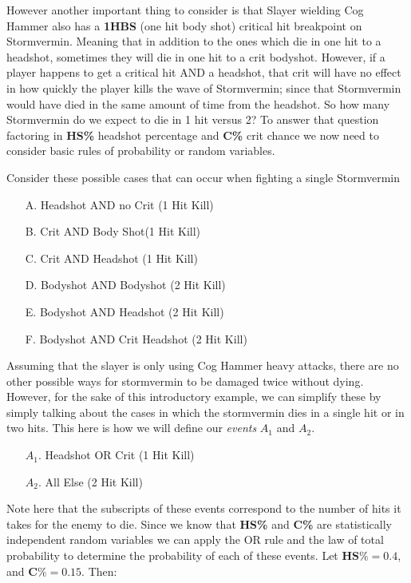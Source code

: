 \documentclass{article}
\begin{document}
However another important thing to consider is that Slayer wielding Cog Hammer also has a \textbf{1HBS} (one hit body shot) critical hit breakpoint on Stormvermin. Meaning that in addition to the ones which die in one hit to a headshot, sometimes they will die in one hit to a crit bodyshot. However, if a player happens to get a critical hit AND a headshot, that crit will have no effect in how quickly the player kills the wave of Stormvermin; since that Stormvermin would have died in the same amount of time from the headshot. So how many Stormvermin do we expect to die in 1 hit versus 2? To answer that question factoring in \textbf{HS\%} headshot percentage and \textbf{C\%} crit chance we now need to consider basic rules of probability or random variables.

Consider these possible cases that can occur when fighting a single Stormvermin
\begin{enumerate}
\item[A.] Headshot AND no Crit (1 Hit Kill)
\item[B.] Crit AND Body Shot(1 Hit Kill)
\item[C.] Crit AND Headshot (1 Hit Kill)
\item[D.] Bodyshot AND Bodyshot (2 Hit Kill)
\item[E.] Bodyshot AND Headshot (2 Hit Kill)
\item[F.] Bodyshot AND Crit Headshot (2 Hit Kill)
\end{enumerate}

Assuming that the slayer is only using Cog Hammer heavy attacks, there are no other possible ways for stormvermin to be damaged twice without dying. However, for the sake of this introductory example, we can simplify these by simply talking about the cases in which the stormvermin dies in a single hit or in two hits. This here is how we will define our \emph{events} $A_1$ and $A_2$.

\begin{enumerate}
\item[$A_1$.] Headshot OR Crit (1 Hit Kill)
\item[$A_2$.] All Else (2 Hit Kill)
\end{enumerate}

Note here that the subscripts of these events correspond to the number of hits it takes for the enemy to die. Since we know that \textbf{HS\%} and \textbf{C\%} are statistically independent random variables we can apply the OR rule and the law of total probability to determine the probability of each of these events. Let $\mathbf{HS\%}= 0.4$, and $\mathbf{C\%} = 0.15$. Then:
\end{document}
